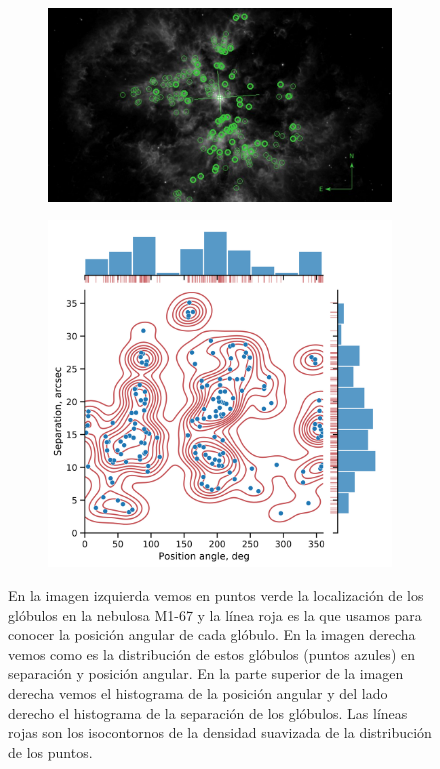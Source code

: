 \documentclass{book}
\begin{document}
\begin{figure}[htb]
    \centering  
    \begin{subfigure}[b]{0.45\linewidth}
        \includegraphics[width=\textwidth]{ultimas correcciones/M167_glo.pdf}
    \end{subfigure}
    \begin{subfigure}[b]{0.45\linewidth}
        \includegraphics[width=\textwidth]{images Chapter 2/C2_nudos_distribucion.png}
    \end{subfigure}
    \caption{En la imagen izquierda vemos en puntos verde la
      localización de los glóbulos en la nebulosa M1-67 y la línea
      roja es la que usamos para conocer la posición angular de cada
      glóbulo. En la imagen derecha vemos como es la distribución de
      estos glóbulos (puntos azules) en separación y posición angular.
      En la parte superior de la imagen derecha vemos el histograma de
      la posición angular y del lado derecho el histograma de la
      separación de los glóbulos. Las líneas rojas son los
      isocontornos de la densidad suavizada de la distribución de los
      puntos.}
    \label{fig:dis_nudos}
\end{figure}
\end{document}
